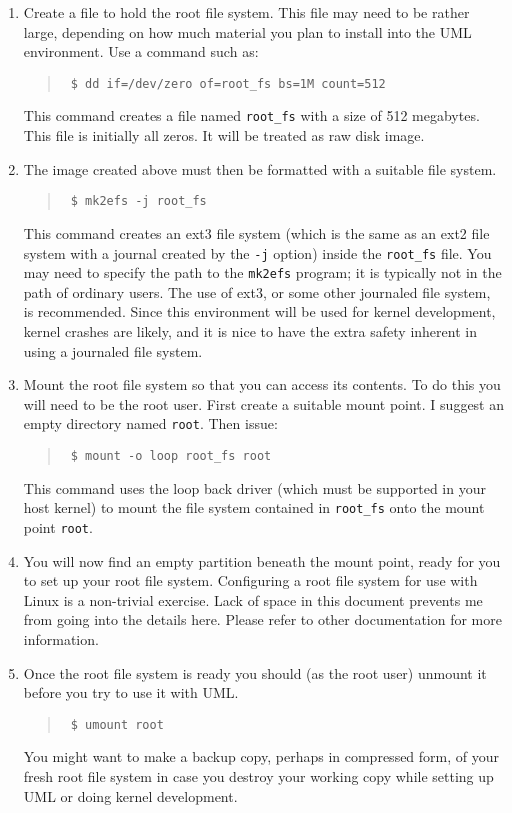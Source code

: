 \documentclass{article}
\newcommand{\command}[1]{\texttt{#1}}
\newcommand{\filename}[1]{\texttt{#1}}
\newenvironment{commands}
  {\begin{quote} \tt}
  {\end{quote}}
\begin{document}
\begin{enumerate}

\item Create a file to hold the root file system. This file may need to be rather large,
  depending on how much material you plan to install into the UML environment. Use a command
  such as:
  \begin{commands}
    \$ dd if=/dev/zero of=root\_fs bs=1M count=512
  \end{commands}

  This command creates a file named \filename{root\_fs} with a size of 512 megabytes. This file
  is initially all zeros. It will be treated as raw disk image.

\item The image created above must then be formatted with a suitable file system.
  \begin{commands}
    \$ mk2efs -j root\_fs
  \end{commands}

  This command creates an ext3 file system (which is the same as an ext2 file system with a
  journal created by the \command{-j} option) inside the \filename{root\_fs} file. You may need
  to specify the path to the \command{mk2efs} program; it is typically not in the path of
  ordinary users. The use of ext3, or some other journaled file system, is recommended. Since
  this environment will be used for kernel development, kernel crashes are likely, and it is nice
  to have the extra safety inherent in using a journaled file system.

\item Mount the root file system so that you can access its contents. To do this you will need
  to be the root user. First create a suitable mount point. I suggest an empty directory named
  \filename{root}. Then issue:
  \begin{commands}
    \$ mount -o loop root\_fs root
  \end{commands}

  This command uses the loop back driver (which must be supported in your host kernel) to mount
  the file system contained in \filename{root\_fs} onto the mount point \filename{root}.

\item You will now find an empty partition beneath the mount point, ready for you to set up your
  root file system. Configuring a root file system for use with Linux is a non-trivial exercise.
  Lack of space in this document prevents me from going into the details here. Please refer to
  other documentation for more information.

\item Once the root file system is ready you should (as the root user) unmount it before you try
  to use it with UML.
  \begin{commands}
    \$ umount root
  \end{commands}

  You might want to make a backup copy, perhaps in compressed form, of your fresh root file
  system in case you destroy your working copy while setting up UML or doing kernel development.

\end{enumerate}
\end{document}
